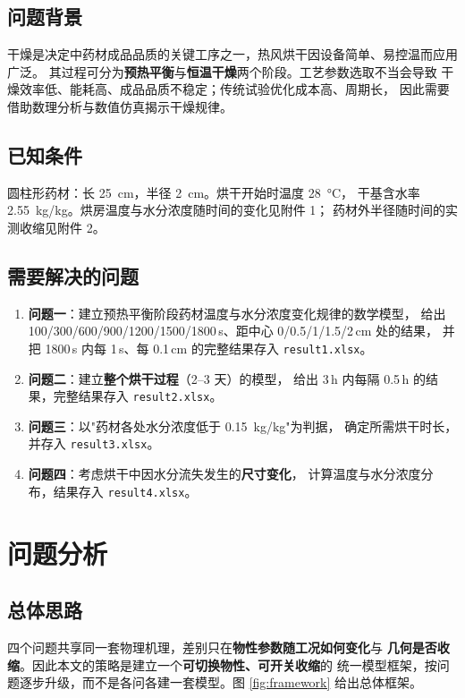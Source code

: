 \documentclass[withoutpreface,bwprint]{cumcmthesis}
\begin{document}
\subsection{问题背景}
干燥是决定中药材成品品质的关键工序之一，热风烘干因设备简单、易控温而应用广泛。
其过程可分为\textbf{预热平衡}与\textbf{恒温干燥}两个阶段。工艺参数选取不当会导致
干燥效率低、能耗高、成品品质不稳定；传统试验优化成本高、周期长，
因此需要借助数理分析与数值仿真揭示干燥规律。

\subsection{已知条件}
圆柱形药材：长 \SI{25}{cm}，半径 \SI{2}{cm}。烘干开始时温度 \SI{28}{\celsius}，
干基含水率 \SI{2.55}{kg/kg}。烘房温度与水分浓度随时间的变化见附件 1；
药材外半径随时间的实测收缩见附件 2。

\subsection{需要解决的问题}
\begin{enumerate}
  \item \textbf{问题一}：建立预热平衡阶段药材温度与水分浓度变化规律的数学模型，
        给出 100/300/600/900/1200/1500/1800\,s、距中心 0/0.5/1/1.5/2\,cm 处的结果，
        并把 1800\,s 内每 1\,s、每 0.1\,cm 的完整结果存入 \texttt{result1.xlsx}。
  \item \textbf{问题二}：建立\textbf{整个烘干过程}（2--3 天）的模型，
        给出 3\,h 内每隔 0.5\,h 的结果，完整结果存入 \texttt{result2.xlsx}。
  \item \textbf{问题三}：以"药材各处水分浓度低于 \SI{0.15}{kg/kg}"为判据，
        确定所需烘干时长，并存入 \texttt{result3.xlsx}。
  \item \textbf{问题四}：考虑烘干中因水分流失发生的\textbf{尺寸变化}，
        计算温度与水分浓度分布，结果存入 \texttt{result4.xlsx}。
\end{enumerate}

\section{问题分析}

\subsection{总体思路}
四个问题共享同一套物理机理，差别只在\textbf{物性参数随工况如何变化}与
\textbf{几何是否收缩}。因此本文的策略是建立一个\textbf{可切换物性、可开关收缩}的
统一模型框架，按问题逐步升级，而不是各问各建一套模型。图 \ref{fig:framework}
给出总体框架。
\end{document}
